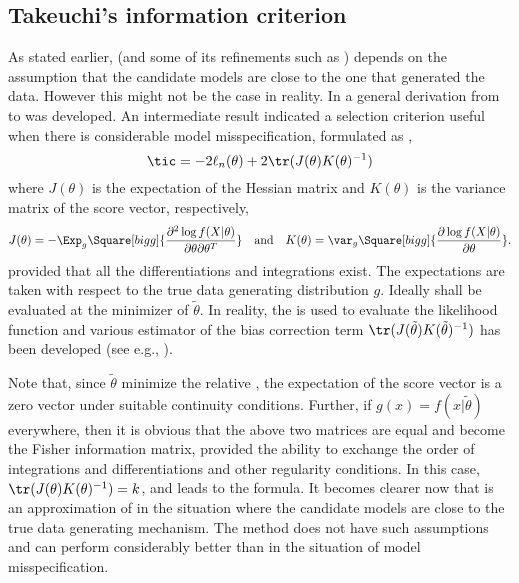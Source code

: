 \subsection{Takeuchi's information criterion}
\label{sub:Takeuchi's information criterion}

As stated earlier, \aic (and some of its refinements such as \aicc) depends on
the assumption that the candidate models are close to the one that generated
the data. However this might not be the case in reality. In
\cite{Takeuchi:1976vx} a general derivation from \kld to \aic was developed.
An intermediate result indicated a selection criterion useful when there is
considerable model misspecification, formulated as \tic,
\begin{equation}
  \tic = -2\ell_n(\theta) + 2\tr(J(\theta)K(\theta)^{-1})
  \label{eq:tic}
\end{equation}
where $J(\theta)$ is the expectation of the Hessian matrix and $K(\theta)$ is
the variance matrix of the score vector, respectively,
\begin{equation}
  J(\theta) = -\Exp_g\Square[bigg]{
    \frac{\partial^2\log f(X|\theta)}{\partial\theta\partial\theta^T}
  }\quad\text{and}\quad
  K(\theta) = \var_g\Square[bigg]{
    \frac{\partial\log f(X|\theta)}{\partial\theta}
  }.
\end{equation}
provided that all the differentiations and integrations exist. The
expectations are taken with respect to the true data generating distribution
$g$. Ideally \tic shall be evaluated at the minimizer of \kld $\tilde\theta$.
In reality, the \mle is used to evaluate the likelihood function and various
estimator of the bias correction term
$\tr(J(\tilde\theta)K(\tilde\theta)^{-1})$ has been developed (see e.g.,
\cite{Claeskens:2008tq}).

Note that, since $\tilde\theta$ minimize the relative \kld, the expectation of
the score vector is a zero vector under suitable continuity conditions.
Further, if $g(x) = f(x|\tilde\theta)$ everywhere, then it is obvious that the
above two matrices are equal and become the Fisher information matrix,
provided the ability to exchange the order of integrations and
differentiations and other regularity conditions. In this case,
$\tr(J(\theta)K(\theta)^{-1}) = k$, and \tic leads to the \aic formula. It
becomes clearer now that \aic is an approximation of \tic in the situation
where the candidate models are close to the true data generating mechanism.
The \tic method does not have such assumptions and can perform considerably
better than \aic in the situation of model misspecification.

